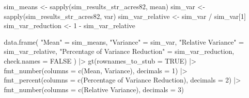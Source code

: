 \documentclass[
  letterpaper,
  DIV=11,
  numbers=noendperiod]{scrreprt}
\newenvironment{Shaded}{\begin{snugshade}}{\end{snugshade}}
\newcommand{\AttributeTok}[1]{\textcolor[rgb]{0.40,0.45,0.13}{#1}}
\newcommand{\ConstantTok}[1]{\textcolor[rgb]{0.56,0.35,0.01}{#1}}
\newcommand{\DecValTok}[1]{\textcolor[rgb]{0.68,0.00,0.00}{#1}}
\newcommand{\FunctionTok}[1]{\textcolor[rgb]{0.28,0.35,0.67}{#1}}
\newcommand{\NormalTok}[1]{\textcolor[rgb]{0.00,0.23,0.31}{#1}}
\newcommand{\OtherTok}[1]{\textcolor[rgb]{0.00,0.23,0.31}{#1}}
\newcommand{\SpecialCharTok}[1]{\textcolor[rgb]{0.37,0.37,0.37}{#1}}
\newcommand{\StringTok}[1]{\textcolor[rgb]{0.13,0.47,0.30}{#1}}
\renewcommand{\[}{\begin{equation}}
\renewcommand{\]}{\end{equation}}
\begin{document}
\begin{Shaded}
\begin{Highlighting}[]
\NormalTok{sim\_means }\OtherTok{\textless{}{-}} \FunctionTok{sapply}\NormalTok{(sim\_results\_str\_acres82, mean)}
\NormalTok{sim\_var }\OtherTok{\textless{}{-}} \FunctionTok{sapply}\NormalTok{(sim\_results\_str\_acres82, var)}
\NormalTok{sim\_var\_relative }\OtherTok{\textless{}{-}}\NormalTok{ sim\_var }\SpecialCharTok{/}\NormalTok{ sim\_var[}\DecValTok{1}\NormalTok{]}
\NormalTok{sim\_var\_reduction }\OtherTok{\textless{}{-}} \DecValTok{1} \SpecialCharTok{{-}}\NormalTok{ sim\_var\_relative}

\FunctionTok{data.frame}\NormalTok{(}
  \StringTok{"Mean"} \OtherTok{=}\NormalTok{ sim\_means,}
  \StringTok{"Variance"} \OtherTok{=}\NormalTok{ sim\_var,}
  \StringTok{"Relative Variance"} \OtherTok{=}\NormalTok{ sim\_var\_relative,}
  \StringTok{"Percentage of Variance Reduction"} \OtherTok{=}\NormalTok{ sim\_var\_reduction,}
  \AttributeTok{check.names =} \ConstantTok{FALSE}
\NormalTok{) }\SpecialCharTok{|\textgreater{}}
  \FunctionTok{gt}\NormalTok{(}\AttributeTok{rownames\_to\_stub =} \ConstantTok{TRUE}\NormalTok{) }\SpecialCharTok{|\textgreater{}}
  \FunctionTok{fmt\_number}\NormalTok{(}\AttributeTok{columns =} \FunctionTok{c}\NormalTok{(Mean, Variance), }\AttributeTok{decimals =} \DecValTok{1}\NormalTok{) }\SpecialCharTok{|\textgreater{}}
  \FunctionTok{fmt\_percent}\NormalTok{(}\AttributeTok{columns =} \FunctionTok{c}\NormalTok{(}\StringTok{\textasciigrave{}}\AttributeTok{Percentage of Variance Reduction}\StringTok{\textasciigrave{}}\NormalTok{), }\AttributeTok{decimals =} \DecValTok{2}\NormalTok{) }\SpecialCharTok{|\textgreater{}}
  \FunctionTok{fmt\_number}\NormalTok{(}\AttributeTok{columns =} \FunctionTok{c}\NormalTok{(}\StringTok{\textasciigrave{}}\AttributeTok{Relative Variance}\StringTok{\textasciigrave{}}\NormalTok{), }\AttributeTok{decimals =} \DecValTok{3}\NormalTok{)}
\end{Highlighting}
\end{Shaded}

\begin{table}

\caption{\label{tbl-agpop-acres82-compare-methods}Simulated mean,
variance, and variance reduction by allocation method (acres82 strata)}


\end{table}%
\end{document}
